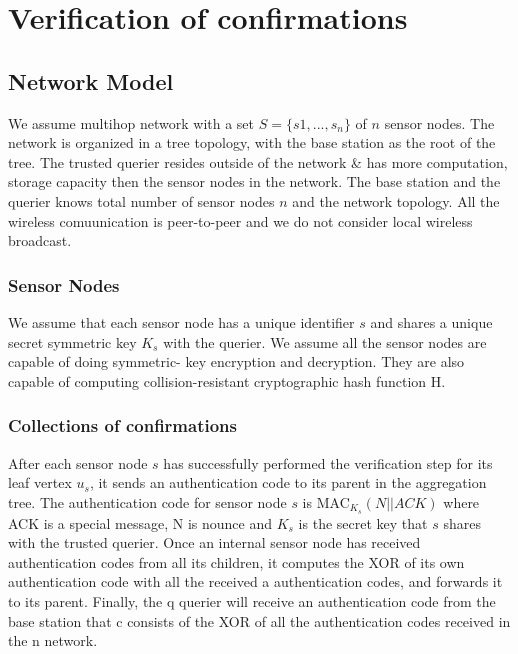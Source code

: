 \chapter{Verification of confirmations}

\section{Network Model}

We assume multihop network with a set $ S = \{s1,...,s_{n}\} $ of $n$
sensor nodes. The network is organized in a tree topology, with the
base station as the root of the tree. The trusted querier resides
outside of the network \& has more computation, storage capacity then the 
sensor nodes in the network. The base station and the querier knows total 
number of sensor nodes $n$ and the network topology. All the wireless
comuunication is peer-to-peer and we do not consider local wireless 
broadcast.

\subsection{Sensor Nodes}

We assume that each sensor node has a unique identifier $s$ and
shares a unique secret symmetric key $K_{s}$ with the querier. 
We assume all the sensor nodes are capable of doing symmetric-
key encryption and decryption. They are also capable of computing collision-resistant cryptographic hash function H.

\subsection{Collections of confirmations}
After each sensor node $s$ has successfully performed the 
verification step for its leaf vertex $u_{s}$, it sends an 
authentication code to its parent in the aggregation tree.
The authentication code for sensor node $s$ is MAC$_{K_{s}}(N||ACK)$
where ACK is a special message, N is nounce and $K_{s}$ is the secret 
key that $s$ shares with the trusted querier. Once an internal sensor
node has received authentication codes from all its children, it 
computes the XOR of its own authentication code with all the received a
authentication codes, and forwards it to its parent. Finally, the q
querier will receive an authentication code from the base station that c
consists of the XOR of all the authentication codes received in the n
network. 

